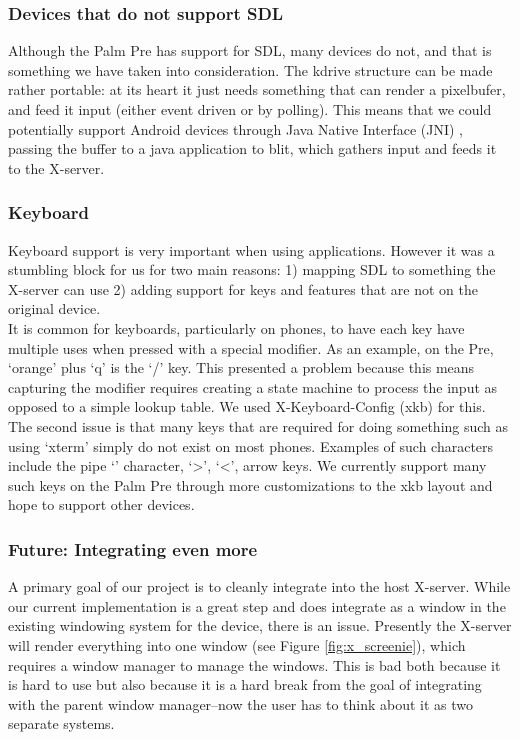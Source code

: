 \subsubsection{Devices that do not support SDL}
Although the Palm Pre has support for SDL, many devices do not, and that is something we have taken into consideration.  The kdrive structure can be made rather portable: at its heart it just needs something that can render a pixelbufer, and feed it input (either event driven or by polling).  This means that we could potentially support Android devices through Java Native Interface (JNI) \cite{jni}, passing the buffer to a java application to blit, which gathers input and feeds it to the X-server. \\

\subsubsection{Keyboard}
Keyboard support is very important when using applications.  However it was a stumbling block for us for two main reasons: 1) mapping SDL to something the X-server can use 2) adding support for keys and features that are not on the original device.\\

It is common for keyboards, particularly on phones, to have each key have multiple uses when pressed with a special modifier.  As an example, on the Pre, `orange' plus `q' is the `/' key.  This presented a problem because this means capturing the modifier requires creating a state machine to process the input as opposed to a simple lookup table.  We used X-Keyboard-Config (xkb) for this. \\

The second issue is that many keys that are required for doing something such as using `xterm' simply do not exist on most phones.  Examples of such characters include the pipe `\textbar' character, `\textgreater', `\textless', arrow keys.  We currently support many such keys on the Palm Pre through more customizations to the xkb layout and hope to support other devices. \\

\subsubsection{Future: Integrating even more}
A primary goal of our project is to cleanly integrate into the host X-server.  While our current implementation is a great step and does integrate as a window in the existing windowing system for the device, there is an issue.  Presently the X-server will render everything into one window (see Figure \ref{fig:x_screenie}), which requires a window manager to manage the windows.  This is bad both because it is hard to use but also because it is a hard break from the goal of integrating with the parent window manager--now the user has to think about it as two separate systems.\\

